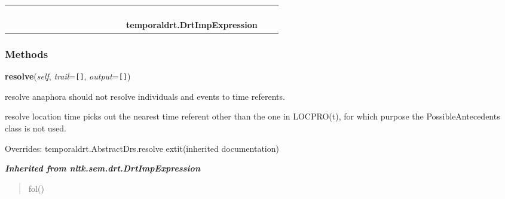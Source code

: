 \begin{tabular}{cccccccccccccccccc}
&&\multicolumn{1}{|c}{}
&&\multicolumn{1}{|c}{}
  \\\cline{13-13}
  &&&&&&&&&&&&\multicolumn{1}{c|}{}
&\multicolumn{1}{|c}{}&
&\multicolumn{1}{|c}{}&
  \\
\multicolumn{14}{r}{\settowidth{\BCL}{nltk.sem.drt.DrtImpExpression}\multirow{2}{\BCL}{nltk.sem.drt.DrtImpExpression}}
&&\multicolumn{1}{|c}{}
  \\\cline{15-15}
  &&&&&&&&&&&&&&\multicolumn{1}{c|}{}
&\multicolumn{1}{|c}{}&
  \\
&&&&&&&&&&&&&&\multicolumn{2}{l}{\textbf{temporaldrt.DrtImpExpression}}
\end{tabular}



  \subsubsection{Methods}

    \vspace{0.5ex}

\hspace{.8\funcindent}\begin{boxedminipage}{\funcwidth}

    \raggedright \textbf{resolve}(\textit{self}, \textit{trail}={\tt \texttt{[}\texttt{]}}, \textit{output}={\tt \texttt{[}\texttt{]}})

\setlength{\parskip}{2ex}
    resolve anaphora should not resolve individuals and events to time 
    referents.

    resolve location time picks out the nearest time referent other than 
    the one in LOCPRO(t), for which purpose the PossibleAntecedents class 
    is not used.

\setlength{\parskip}{1ex}
      Overrides: temporaldrt.AbstractDrs.resolve 	extit{(inherited documentation)}

    \end{boxedminipage}


\large{\textbf{\textit{Inherited from nltk.sem.drt.DrtImpExpression}}}

\begin{quote}
fol()
\end{quote}

